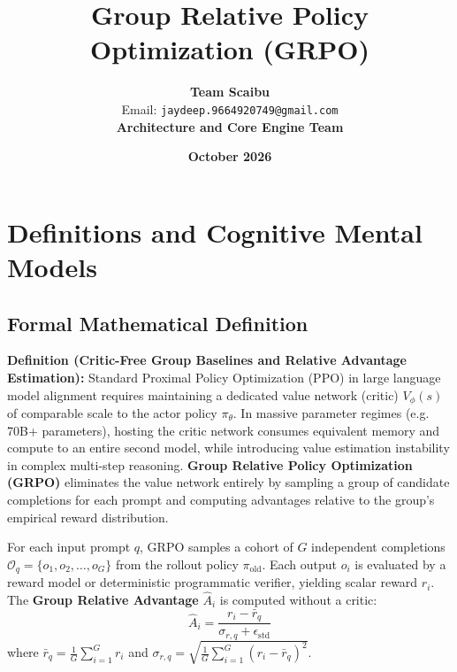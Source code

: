 \documentclass[11pt,a4paper]{article}
\title{\textbf{Group Relative Policy Optimization (GRPO)}}
\author{\textbf{Team Scaibu} \\ \small Email: \texttt{jaydeep.9664920749@gmail.com} \\ \small \textbf{Architecture and Core Engine Team}}
\date{\textbf{October 2026}}
\theoremstyle{definition}
\begin{document}
\maketitle

\section{Definitions and Cognitive Mental Models}

\subsection{Formal Mathematical Definition}
\textbf{Definition (Critic-Free Group Baselines and Relative Advantage Estimation):}
Standard Proximal Policy Optimization (PPO) in large language model alignment requires maintaining a dedicated value network (critic) $V_\phi(s)$ of comparable scale to the actor policy $\pi_\theta$. In massive parameter regimes (e.g. 70B+ parameters), hosting the critic network consumes equivalent memory and compute to an entire second model, while introducing value estimation instability in complex multi-step reasoning. \textbf{Group Relative Policy Optimization (GRPO)} eliminates the value network entirely by sampling a group of candidate completions for each prompt and computing advantages relative to the group's empirical reward distribution.

For each input prompt $q$, GRPO samples a cohort of $G$ independent completions $\mathcal{O}_q = \{o_1, o_2, \dots, o_G\}$ from the rollout policy $\pi_{\text{old}}$. Each output $o_i$ is evaluated by a reward model or deterministic programmatic verifier, yielding scalar reward $r_i$. The \textbf{Group Relative Advantage} $\hat{A}_i$ is computed without a critic:
{\boldmath
\begin{equation}
\hat{A}_i = \frac{r_i - \bar{r}_q}{\sigma_{r, q} + \epsilon_{\text{std}}}
\end{equation}
}
where $\bar{r}_q = \frac{1}{G}\sum_{i=1}^G r_i$ and $\sigma_{r, q} = \sqrt{\frac{1}{G}\sum_{i=1}^G (r_i - \bar{r}_q)^2}$.
\end{document}
